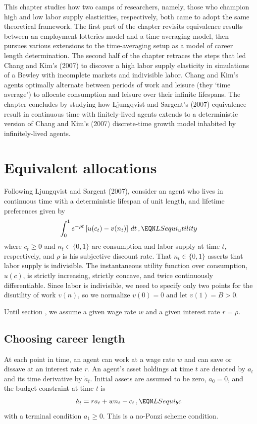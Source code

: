 This chapter studies  how two camps of
researchers, namely, those who champion high and low labor supply elasticities,
respectively, both came to adopt the same theoretical framework.%
The first part  of the chapter revisits equivalence
results between an employment lotteries model and a time-averaging
model, then pursues various extensions to the time-averaging setup as a model of  career
length determination. The second half of the chapter retraces the  steps that led  Chang and
Kim's (2007) to discover a high labor supply elasticity in
simulations of a Bewley with incomplete markets and indivisible
labor. Chang and Kim's agents optimally alternate between periods of work and leisure
(they `time average')   to  allocate consumption
and leisure over their infinite lifespans. The chapter concludes by studying
how Ljungqvist and Sargent's (2007) equivalence result in continuous
time with finitely-lived agents extends to a deterministic version
of Chang and Kim's (2007) discrete-time growth model inhabited by
infinitely-lived agents.

%
%
%
%





\section{Equivalent allocations}\label{sec:LSequi}%
Following Ljungqvist and Sargent (2007), consider an agent who
lives in continuous time with a deterministic
lifespan of unit length, and lifetime preferences given by
$$
\int_0^1 e^{-\rho t} \left[u(c_t) - v(n_t) \right]\,dt\,,
\EQN LSequi_utility
$$
where $c_t\geq 0$ and $n_t\in \{0,1\}$ are consumption and labor supply
at time $t$, respectively, and $\rho$ is his subjective discount rate.
That $n_t\in \{0,1\}$ asserts that labor
supply is indivisible. The instantaneous utility function over
consumption, $u(c)$, is strictly increasing, strictly concave, and
twice continuously differentiable. Since labor is
indivisible, we need  to specify only two points for the disutility
of work $v(n)$, so we normalize $v(0)=0$ and let $v(1)=B > 0$.

Until section , we  assume a given wage rate $w$ and a
given interest rate $r=\rho$.



\subsection{Choosing career length}\label{sec:LS_lifetime}%
At each point in time, an agent can  work at a wage rate
$w$ and can save or dissave at an interest rate $r$. An agent's asset
holdings at time $t$ are denoted by $a_t$ and its time derivative
by $\dot{a}_t$. Initial assets are assumed to be zero, $a_0=0$, and
the budget constraint at time $t$ is
$$
\dot{a}_t = r a_t + w n_t - c_t\,,
\EQN LSequi_bc
$$
with a terminal condition $a_1\geq 0$. This is a no-Ponzi scheme condition.

